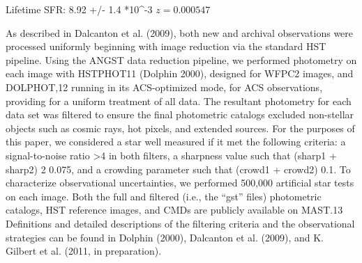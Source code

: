 
Lifetime SFR: 8.92 +/- 1.4 *10^-3
$z = 0.000547$

As described in Dalcanton et al. (2009), both new and archival observations were processed uniformly beginning with image reduction via the standard HST pipeline. Using the ANGST data reduction pipeline, we performed photometry on each image with HSTPHOT11 (Dolphin 2000), designed for WFPC2 images, and DOLPHOT,12 running in its ACS-optimized mode, for ACS observations, providing for a uniform treatment of all data. The resultant photometry for each data set was filtered to ensure the final photometric catalogs excluded non-stellar objects such as cosmic rays, hot pixels, and extended sources. For the purposes of this paper, we considered a star well measured if it met the following criteria: a signal-to-noise ratio >4 in both filters, a sharpness value such that (sharp1 + sharp2) 2  0.075, and a crowding parameter such that (crowd1 + crowd2)  0.1. To characterize observational uncertainties, we performed 500,000 artificial star tests on each image. Both the full and filtered (i.e., the “gst” files) photometric catalogs, HST reference images, and CMDs are publicly available on MAST.13 Definitions and detailed descriptions of the filtering criteria and the observational strategies can be found in Dolphin (2000), Dalcanton et al. (2009), and K. Gilbert et al. (2011, in preparation).


